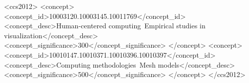 \documentclass[review,anonymous,acmtog]{acmart}
\begin{document}


\begin{CCSXML}
<ccs2012>
   <concept>
    <concept_id>10003120.10003145.10011769</concept_id>
       <concept_desc>Human-centered computing~Empirical studies in visualization</concept_desc>
       <concept_significance>300</concept_significance>
       </concept>
   <concept>
       <concept_id>10010147.10010371.10010396.10010397</concept_id>
       <concept_desc>Computing methodologies~Mesh models</concept_desc>
       <concept_significance>500</concept_significance>
       </concept>
 </ccs2012>
\end{CCSXML}

\end{document}
